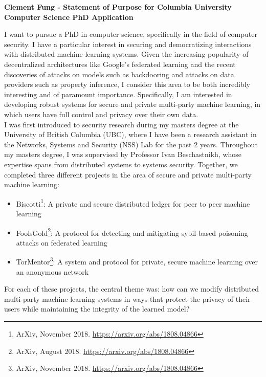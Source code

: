 \documentclass[10pt]{article} %
\begin{document}
\begin{center}
{\large \bf Clement Fung - Statement of Purpose for Columbia University Computer Science PhD Application}
\end{center}

I want to pursue a PhD in computer science, specifically in the field of computer security. I have a particular interest in securing and democratizing interactions with distributed machine learning systems. Given the increasing popularity of decentralized architectures like Google’s federated learning and the recent discoveries of attacks on models such as backdooring and attacks on data providers such as property inference, I consider this area to be both incredibly interesting and of paramount importance. Specifically, I am interested in developing robust systems for secure and private multi-party machine learning, in which users have full control and privacy over their own data. \\

I was first introduced to security research during my masters degree at the University of British Columbia (UBC), where I have been a research assistant in the Networks, Systems and Security (NSS) Lab for the past 2 years. Throughout my masters degree, I was supervised by Professor Ivan Beschastnikh, whose expertise spans from distributed systems to systems security. Together, we completed three different projects in the area of secure and private multi-party machine learning:
\begin{itemize}
\item Biscotti\footnote{ArXiv, November 2018. \url{https://arxiv.org/abs/1808.04866}}: A private and secure distributed ledger for peer to peer machine learning
\item FoolsGold\footnote{ArXiv, August 2018. \url{https://arxiv.org/abs/1808.04866}}: A protocol for detecting and mitigating sybil-based poisoning attacks on federated learning
\item TorMentor\footnote{ArXiv, November 2018. \url{https://arxiv.org/abs/1808.04866}}: A system and protocol for private, secure machine learning over an anonymous network
\end{itemize}

For each of these projects, the central theme was: how can we modify distributed multi-party machine learning systems in ways that protect the privacy of their users while maintaining the integrity of the learned model? \\
\end{document}
